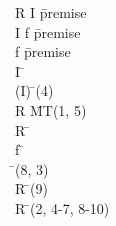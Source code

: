 \documentclass{article}
\begin{document}
\begin{proofbox}
\: R \rightarrow \lnot I \= \hbox{premise} \\
\: I \lor f \= \hbox{premise} \\
\: \lnot f \= \hbox{premise} \\
\openAlt
\: I \= \asm \\
\: \lnot (\lnot I) \= \doublenegintro(4) \\
\: \lnot R \= MT(1, 5) \\
\: \lnot R \=  \\
\splitAlt
\: f \= \asm \\
\: \bot \= \bottomintro(8, 3) \\
\: \lnot R \= \bottomelim(9) \\
\closeAlt
\: \lnot R \= \orelim(2, 4-7, 8-10) \\
\end{proofbox}
\end{document}
